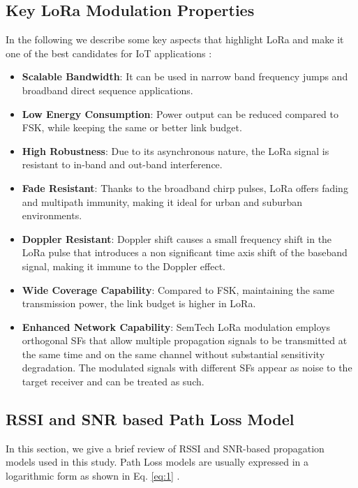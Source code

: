 \subsection{Key LoRa Modulation Properties}

In the following we describe some key aspects that highlight LoRa and make it one of the best candidates for IoT applications \cite{Semtech2015}:

\begin{itemize}

\item \textbf {Scalable Bandwidth}: It can be used in narrow band frequency jumps and broadband direct sequence applications.
\item \textbf {Low Energy Consumption}: Power output can be reduced compared to FSK, while keeping the same or better link budget.
\item \textbf {High Robustness}: Due to its asynchronous nature, the LoRa signal is resistant to in-band and out-band interference.
\item \textbf {Fade Resistant}: Thanks to the broadband chirp pulses, LoRa offers fading and multipath immunity, making it ideal for urban and suburban environments.
\item \textbf {Doppler Resistant}: Doppler shift causes a small frequency shift in the LoRa pulse that introduces a non significant time axis shift of the baseband signal, making it immune to the Doppler effect.
\item \textbf {Wide Coverage Capability}: Compared to FSK, maintaining the same transmission power, the link budget is higher in LoRa.
\item \textbf {Enhanced Network Capability}: SemTech LoRa modulation employs orthogonal SFs that allow multiple propagation signals to be transmitted at the same time and on the same channel without substantial sensitivity degradation. The modulated signals with different SFs appear as noise to the target receiver and can be treated as such.

\end{itemize}

\subsection{RSSI and SNR based Path Loss Model}
\label{sec:theory}
In this section, we give a brief review of RSSI and SNR-based propagation models used in this study. Path Loss models are usually expressed in a logarithmic form as shown in Eq. \eqref{eq:1} \cite{Iswandi2017}.

